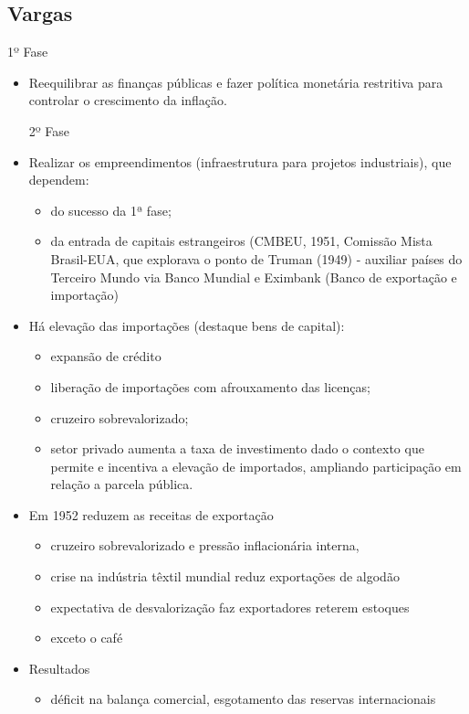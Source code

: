 \documentclass[a4paper,12pt]{article}[abntex2]
\begin{document}
\subsection{Vargas}
1º Fase
\begin{itemize}
    \item Reequilibrar as finanças públicas e fazer política monetária restritiva para controlar o crescimento da inflação.

2º Fase
\item Realizar os empreendimentos (infraestrutura para projetos industriais), que dependem:
\begin{itemize}
    \item do sucesso da 1ª fase;
    \item da entrada de capitais estrangeiros (CMBEU, 1951, Comissão Mista Brasil-EUA, que explorava o ponto de Truman (1949) - auxiliar países do Terceiro Mundo via Banco Mundial e Eximbank (Banco de exportação e importação)
\end{itemize}
    \item Há elevação das importações (destaque bens de capital):
    \begin{itemize}
        \item expansão de crédito
        \item liberação de importações com afrouxamento das licenças;
        \item cruzeiro sobrevalorizado;
        \item setor privado aumenta a taxa de investimento dado o contexto que permite e incentiva a elevação de importados, ampliando participação em relação a
parcela pública.
    \end{itemize}
    \item Em 1952 reduzem as receitas de exportação 
    \begin{itemize}
        \item cruzeiro sobrevalorizado e pressão inflacionária interna,
        \item crise na indústria têxtil mundial reduz exportações de algodão
        \item expectativa de desvalorização faz exportadores reterem estoques
        \item exceto o café
    \end{itemize}
    \item Resultados
    \begin{itemize}
        \item  déficit na balança comercial, esgotamento das reservas internacionais

\end{itemize}
\end{itemize}
\end{document}
